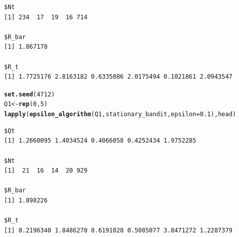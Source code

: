 \documentclass[10pt, a4paper, english]{article}\usepackage[]{graphicx}\usepackage[dvipsnames]{xcolor}
\makeatletter
\newcommand{\hlnum}[1]{\textcolor[rgb]{0.686,0.059,0.569}{#1}}%
\newcommand{\hlstd}[1]{\textcolor[rgb]{0.345,0.345,0.345}{#1}}%
\newcommand{\hlkwb}[1]{\textcolor[rgb]{0.69,0.353,0.396}{#1}}%
\newcommand{\hlkwc}[1]{\textcolor[rgb]{0.333,0.667,0.333}{#1}}%
\newcommand{\hlkwd}[1]{\textcolor[rgb]{0.737,0.353,0.396}{\textbf{#1}}}%
\newenvironment{kframe}{%
 \def\at@end@of@kframe{}%
 \ifinner\ifhmode%
  \def\at@end@of@kframe{\end{minipage}}%
  \begin{minipage}{\columnwidth}%
 \fi\fi%
 \def\FrameCommand##1{\hskip\@totalleftmargin \hskip-\fboxsep
 \colorbox{shadecolor}{##1}\hskip-\fboxsep
     \hskip-\linewidth \hskip-\@totalleftmargin \hskip\columnwidth}%
 \MakeFramed {\advance\hsize-\width
   \@totalleftmargin\z@ \linewidth\hsize
   \@setminipage}}%
 {\par\unskip\endMakeFramed%
 \at@end@of@kframe}
\newenvironment{knitrout}{}{} %
\makeatother
\begin{document}
\begin{knitrout}
\begin{kframe}
\begin{verbatim}
$Nt
[1] 234  17  19  16 714

$R_bar
[1] 1.867178

$R_t
[1] 1.7725176 2.8163182 0.6335086 2.0175494 0.1021861 2.0943547
\end{verbatim}
\begin{alltt}
\hlkwd{set.seed}\hlstd{(}\hlnum{4712}\hlstd{)}
\hlstd{Q1} \hlkwb{<-} \hlkwd{rep}\hlstd{(}\hlnum{0}\hlstd{,} \hlnum{5}\hlstd{)}
\hlkwd{lapply}\hlstd{(}\hlkwd{epsilon_algorithm}\hlstd{(Q1, stationary_bandit,} \hlkwc{epsilon} \hlstd{=} \hlnum{0.1}\hlstd{), head)}
\end{alltt}
\begin{verbatim}
$Qt
[1] 1.2660095 1.4034524 0.4066058 0.4252434 1.9752285

$Nt
[1]  21  16  14  20 929

$R_bar
[1] 1.898226

$R_t
[1] 0.2196340 1.8486270 0.6191028 0.5085077 3.8471272 1.2287379
\end{verbatim}
\end{kframe}
\end{knitrout}
\end{document}
